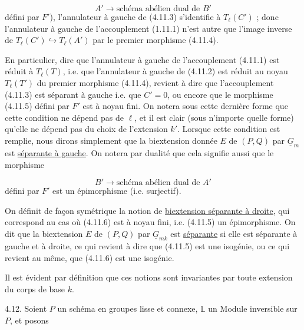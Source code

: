 \begin{equation}\tag{4.11.5}
A' \longrightarrow \text{schéma abélien dual de } B'
\end{equation}
défini par $F'$), l'annulateur à gauche de (4.11.3) s'identifie à $T_{\ell}(C')$ ; donc l'annulateur à gauche de l'accouplement (1.11.1) n'est autre que l'image inverse de $T_{\ell}(C') \hookrightarrow T_{\ell}(A')$ par le premier morphisme (4.11.4).

En particulier, dire que l'annulateur à gauche de l'accouplement (4.11.1) est réduit à $T_{\ell}(T)$, i.e. que l'annulateur à gauche de (4.11.2) est réduit au noyau $T_{\ell}(T')$ du premier morphisme (4.11.4), revient à dire que l'accouplement (4.11.3) est séparant à gauche i.e. que $C' = 0$, ou encore que le morphisme (4.11.5) défini par $F'$ est à noyau fini. On notera sous cette dernière forme que cette condition ne dépend pas de $\ell$, et il est clair (sous n'importe quelle forme) qu'elle ne dépend pas du choix de l'extension $k'$. Lorsque cette condition est remplie, nous dirons simplement que la biextension donnée $E$ de $(P,Q)$ par $\underline{G}_m$ est \underline{séparante à gauche}. On notera par dualité que cela signifie aussi que le morphisme

\begin{equation}\tag{4.11.6}
B' \longrightarrow \text{schéma abélien dual de } A'
\end{equation}
défini par $F'$ est un épimorphisme (i.e. surjectif).



On définit de façon symétrique la notion de \underline{biextension séparante à droite}, qui correspond au cas où (4.11.6) est à noyau fini, i.e. (4.11.5) un épimorphisme. On dit que la biextension $E$ de $(P,Q)$ par $\underline{G}_{mk}$ est \underline{séparante} si elle est séparante à gauche et à droite, ce qui revient à dire que (4.11.5) est une isogénie, ou ce qui revient au même, que (4.11.6) est une isogénie.

Il est évident par définition que ces notions sont invariantes par toute extension du corps de base $k$.

4.12. Soient $P$ un schéma en groupes lisse et connexe, $\mathbb{L}$ un Module inversible sur $P$, et posons

